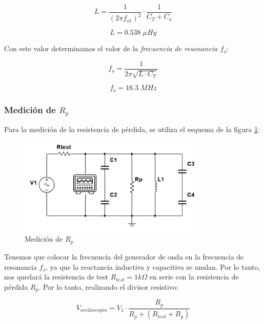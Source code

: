 \begin{equation}
    L = \frac{1}{(2\pi f_{o1})^2} \cdot \frac{1}{C_T + C_o}
\end{equation}

\begin{equation}
    \boxed{L = 0.538\; \mu Hy}
\end{equation}

Con este valor determinamos el valor de la \textit{frecuencia de resonancia $f_o$}:

\begin{equation}
    f_o = \frac{1}{2\pi\sqrt{L \cdot C_T}}
\end{equation}

\begin{equation}
    \boxed{f_o = 16.3\; MHz}
\end{equation}


\subsubsection{Medición de $R_p$}

Para la medición de la resistencia de pérdida, se utiliza el esquema de la figura \ref{fig: de la medición de la resistencia de pérdida}:

\begin{figure}[H]
    \centering
    \includegraphics[width=0.8\textwidth]{Imagenes/medicion_rp.png}
    \caption{Medición de $R_p$}
    \label{fig: de la medición de la resistencia de pérdida}
\end{figure}

Tenemos que colocar la frecuencia del generador de onda en la frecuencia de resonancia $f_o$, ya que la reactancia inductiva y capacitiva se anulan.
Por lo tanto, nos quedará la resistencia de test $R_{test} = 1k\Omega$ en serie con la resistencia de pérdida $R_p$. Por lo tanto, realizando el divisor resistivo:

\begin{equation}
    V_{osciloscopio} = V_{1} \cdot \frac{R_p}{R_p + (R_{test}+ R_g)}
\end{equation}

